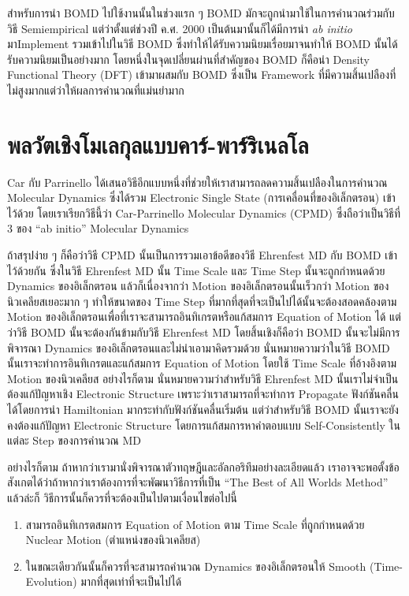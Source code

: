 สำหรับการนำ BOMD ไปใช้งานนั้นในช่วงแรก ๆ BOMD มักจะถูกนำมาใช้ในการคำนวณร่วมกับวิธี Semiempirical แต่ว่าตั้งแต่ช่วงปี ค.ศ. 2000
เป็นต้นมานั้นก็ได้มีการนำ \textit{ab initio} มาImplement รวมเข้าไปในวิธี BOMD ซึ่งทำให้ได้รับความนิยมเรื่อยมาจนทำให้ BOMD
นั้นได้รับความนิยมเป็นอย่างมาก โดยหนึ่งในจุดเปลี่ยนผ่านที่สำคัญของ BOMD ก็คือนำ Density Functional Theory (DFT) เข้ามาผสมกับ BOMD
ซึ่งเป็น Framework ที่มีความสิ้นเปลืองที่ไม่สูงมากแต่ว่าให้ผลการคำนวณที่แม่นยำมาก

\section{พลวัตเชิงโมเลกุลแบบคาร์-พาร์ริเนลโล}

Car กับ Parrinello ได้เสนอวิธีอีกแบบหนึ่งที่ช่วยให้เราสามารถลดความสิ้นเปลืองในการคำนวณ Molecular Dynamics ซึ่งได้รวม Electronic
Single State (การเคลื่อนที่ของอิเล็กตรอน) เข้าไว้ด้วย โดยเราเรียกวิธีนี้ว่า Car-Parrinello Molecular Dynamics (CPMD) ซึ่งถือว่าเป็นวิธีที่
3 ของ \enquote{ab initio} Molecular Dynamics

ถ้าสรุปง่าย ๆ ก็คือว่าวิธี CPMD นั้นเป็นการรวมเอาข้อดีของวิธี Ehrenfest MD กับ BOMD เข้าไว้ด้วยกัน ซึ่งในวิธี Ehrenfest MD นั้น Time Scale
และ Time Step นั้นจะถูกกำหนดด้วย Dynamics ของอิเล็กตรอน แล้วก็เนื่องจากว่า Motion ของอิเล็กตรอนนั้นเร็วกว่า Motion ของนิวเคลียสเยอะมาก ๆ
ทำให้ขนาดของ Time Step ที่มากที่สุดที่จะเป็นไปได้นั้นจะต้องสอดคล้องตาม Motion ของอิเล็กตรอนเพื่อที่เราจะสามารถอินทิเกรตหรือแก้สมการ
Equation of Motion ได้ แต่ว่าวิธี BOMD นั้นจะต้องกันข้ามกับวิธี Ehrenfest MD โดยสิ้นเชิงก็คือว่า BOMD นั้นจะไม่มีการพิจารณา Dynamics
ของอิเล็กตรอนและไม่นำเอามาคิดรวมด้วย นั่นหมายความว่าในวิธี BOMD นั้นเราจะทำการอินทิเกรตและแก้สมการ Equation of Motion โดยใช้
Time Scale ที่อ้างอิงตาม Motion ของนิวเคลียส อย่างไรก็ตาม นั่นหมายความว่าสำหรับวิธี Ehrenfest MD นั้นเราไม่จำเป็นต้องแก้ปัญหาเชิง
Electronic Structure เพราะว่าเราสามารถที่จะทำการ Propagate ฟังก์ชันคลื่นได้โดยการนำ Hamiltonian มากระทำกับฟังก์ชันคลื่นเริ่มต้น
แต่ว่าสำหรับวิธี BOMD นั้นเราจะยังคงต้องแก้ปัญหา Electronic Structure โดยการแก้สมการหาคำตอบแบบ Self-Consistently ในแต่ละ Step
ของการคำนวณ MD

อย่างไรก็ตาม ถ้าหากว่าเรามานั่งพิจารณาตัวทฤษฎีและอัลกอริทึมอย่างละเอียดแล้ว เราอาจจะพอตั้งข้อสังเกตได้ว่าถ้าหากว่าเราต้องการที่จะพัฒนาวิธีการที่เป็น
\enquote{The Best of All Worlds Method} แล้วล่ะก็ วิธีการนั้นก็ควรที่จะต้องเป็นไปตามเงื่อนไขต่อไปนี้

\begin{enumerate}[topsep=0pt,noitemsep]
  \setlength\itemsep{0.5em}
  \item สามารถอินทิเกรตสมการ Equation of Motion ตาม Time Scale ที่ถูกกำหนดด้วย Nuclear Motion (ตำแหน่งของนิวเคลียส)

  \item ในขณะเดียวกันนั้นก็ควรที่จะสามารถคำนวณ Dynamics ของอิเล็กตรอนให้ Smooth (Time-Evolution) มากที่สุดเท่าที่จะเป็นไปได้
\end{enumerate}

